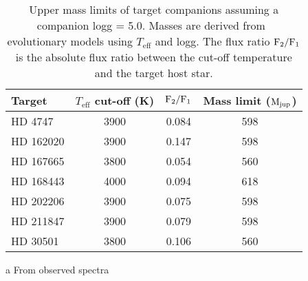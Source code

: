 \begin{table}
       \centering
  \begin{threeparttable}
     
       \caption{Upper mass limits of target companions assuming a companion logg = 5.0. Masses are derived from~\citet{baraffe_new_2015} evolutionary models using \(T_{\textrm{eff}}\) and logg. The flux ratio \(\rm F_2/F_1\) is  the absolute flux ratio between the cut-off temperature and the target host star.}
      
        \begin{tabular}{l c c c}
            \toprule
            Target & \(T_{\textrm{eff}}\) cut-off (K) & \(\rm F_2/F_1\) & Mass limit (\(\rm M_{jup}\))\\
            \midrule
            {HD 4747}     &  3900 & 0.084 & 598 \\ 
            {HD 162020} & 3900 & 0.147 & 598 \\
            {HD 167665} & 3800 & 0.054 & 560 \\
            {HD 168443} & 4000 & 0.094 & 618 \\
            {HD 202206} & 3900 & 0.075 & 598 \\
            {HD 211847} & 3900 & 0.079 & 598 \\
            {HD 30501}   & 3800\tnote{a} & 0.106 & 560 \\
            \bottomrule
        \end{tabular}
        \label{tab:mass_limits}
        \begin{tablenotes}[flushleft]
            \small
                \item [a] {From observed spectra }
        \end{tablenotes}
  \end{threeparttable}

\end{table}

